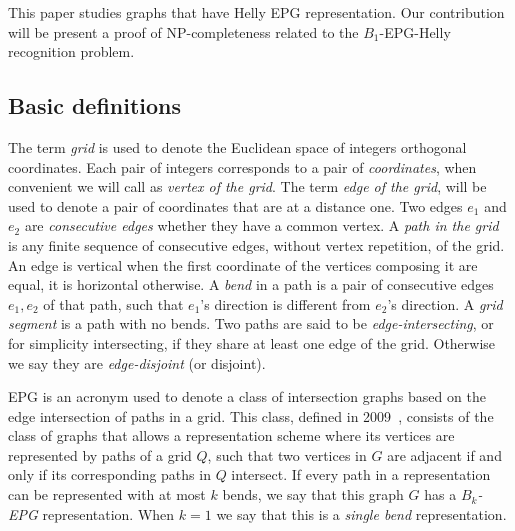 \documentclass[a4paper,11pt]{article}
\begin{document}
This paper studies graphs that have Helly EPG representation. Our contribution will be present a proof of NP-completeness related to the $ B_1$-EPG-Helly recognition problem.%

 
 
 \subsection{Basic definitions}


The term \emph{grid} is used to denote the Euclidean space of integers orthogonal coordinates. Each pair of integers corresponds to a pair of \emph{coordinates},  when convenient we will call as \emph {vertex of the grid}. The term \emph{edge of the grid}, will be used to denote a pair of coordinates that are at a distance one. Two edges $e_1$ and $e_2$ are \emph{consecutive edges} whether they have a common vertex. %
A \emph{path in the grid} is any finite sequence of consecutive edges, without vertex repetition, of the grid.
An edge is vertical when the first coordinate of the vertices composing it are equal, it is horizontal otherwise. A \emph {bend} in a path is a pair of consecutive edges $ e_1, e_2 $ of that path, such that $ e_1$'s direction is different from $ e_2$'s direction. A \emph {grid segment} is a path with no bends. Two paths are said to be \emph{edge-intersecting}, or for simplicity  intersecting, if they share at least one edge of the grid. Otherwise we say they are \emph{edge-disjoint} (or disjoint).

EPG is an acronym used to denote a class of intersection graphs based on the edge intersection of paths in a grid. This class, defined in 2009~\citep{golumbic2009}, consists of the class of graphs that allows a representation scheme where its vertices are represented by paths of a grid $ Q $, such that two vertices in $ G $ are adjacent if and only if its corresponding paths in $ Q $ intersect. If every path in a representation can be represented with at most $ k $ bends, we say that this graph $ G $ has a \emph{ $ B_k$-EPG} representation.%
When $ k = 1 $ we say that this is a \emph{single bend} representation.
\end{document}
